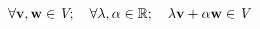 \documentclass[12 pt]{slides}
\begin{document}
\begingroup
\[\forall\textbf{v}, \textbf{w} \in \emph{V};\quad \forall\lambda, \alpha \in \mathbb{R};\quad 
\lambda\textbf{v} + \alpha\textbf{w} \in \emph{V}\]
\endgroup
\end{document}
